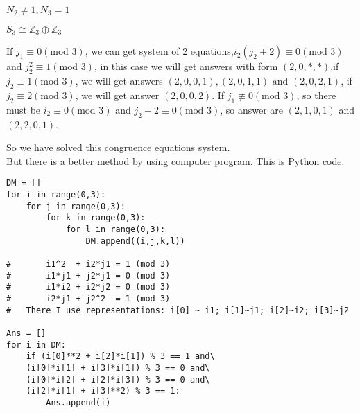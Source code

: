 \documentclass[a4paper,14pt]{article}
\begin{document}
\begin{enumerate}
\begin{item}{$N_2 \neq 1, N_3 = 1$}
\begin{enumerate}
\begin{item}{$S_3\cong \mathbb{Z}_3 \oplus \mathbb{Z}_3$}
\begin{enumerate}
                            If $j_1 \equiv 0 (\text{mod 3})$, we can get system of 2 equations,$i_2(j_2+2) \equiv 0 (\text{mod 3})$ and
                            $j_2^2 \equiv 1 (\text{mod 3})$, in this case we will get answers with form $(2,0,*,*)$,if $j_2 \equiv 1 (\text{mod 3})$,
                            we will get answers $(2,0,0,1),(2,0,1,1) \text{ and } (2,0,2,1)$, if $j_2 \equiv 2 (\text{mod 3})$, we will get answer
                            $(2,0,0,2)$.
                            If $j_1 \not \equiv 0 (\text{mod 3})$, so there must be $i_2 \equiv 0 (\text{mod 3})$ and $j_2 + 2 \equiv 0 (\text{mod 3})$,
                            so answer are $(2,1,0,1)$ and $(2,2,0,1)$.
                    \end{enumerate}
                    So we have solved this congruence equations system.\\
                    
                    But there is a better method by using
                    computer program. This is Python code.
                    \begin{verbatim}
DM = []
for i in range(0,3):
    for j in range(0,3):
        for k in range(0,3):
            for l in range(0,3):
                DM.append((i,j,k,l))

#       i1^2  + i2*j1 = 1 (mod 3)
#       i1*j1 + j2*j1 = 0 (mod 3)
#       i1*i2 + i2*j2 = 0 (mod 3)
#       i2*j1 + j2^2  = 1 (mod 3)
#   There I use representations: i[0] ~ i1; i[1]~j1; i[2]~i2; i[3]~j2

Ans = []
for i in DM:
    if (i[0]**2 + i[2]*i[1]) % 3 == 1 and\
    (i[0]*i[1] + i[3]*i[1]) % 3 == 0 and\
    (i[0]*i[2] + i[2]*i[3]) % 3 == 0 and\
    (i[2]*i[1] + i[3]**2) % 3 == 1:
        Ans.append(i)


\end{verbatim}
\end{item}
\end{enumerate}
\end{item}
\end{enumerate}
\end{document}
